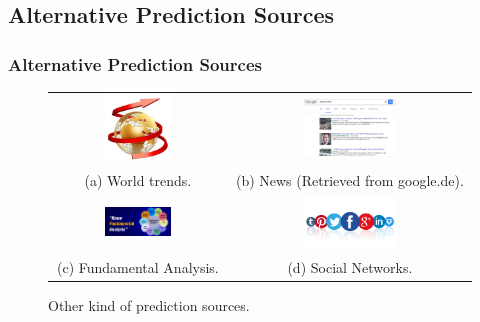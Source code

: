 \documentclass{beamer}
\begin{document}
\subsection{Alternative Prediction Sources}
\begin{frame}
\frametitle{Alternative Prediction Sources}
\begin{figure}
    \centering
		\begin{tabular}{c c}
        \includegraphics[width=0.4\textwidth,height=0.3\textwidth]{world-trends.jpg} &
        \includegraphics[width=0.4\textwidth,height=0.3\textwidth]{NachrichtenGoogle.png} \\
    \scriptsize (a) World trends. & \scriptsize (b) News (Retrieved from google.de).\\		
        \includegraphics[width=0.4\textwidth,height=0.3\textwidth]{fundamental-analysis.jpg} &
        \includegraphics[width=0.4\textwidth,height=0.3\textwidth]{SozialeNetwerke.png} \\
    \scriptsize (c) Fundamental Analysis. & \scriptsize (d) Social Networks. \\
		\end{tabular}	
    \caption{Other kind of prediction sources.}\label{fig:TrendHA}
\end{figure}

\end{frame}
\end{document}
